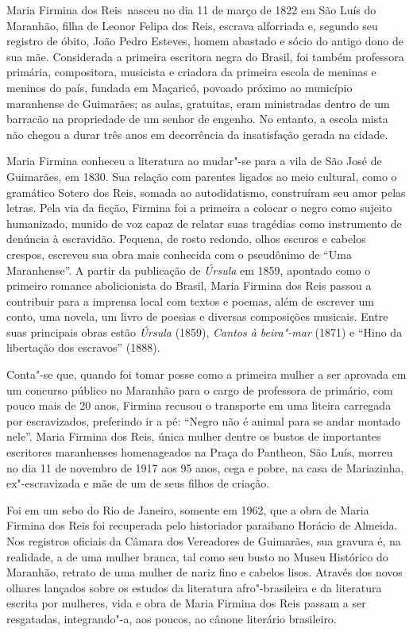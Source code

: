 
Maria Firmina dos Reis~nasceu no dia 11 de março de 1822 em São Luís do
Maranhão, filha de Leonor Felipa dos Reis, escrava alforriada e, segundo
seu registro de óbito, João Pedro Esteves, homem abastado e sócio do
antigo dono de sua mãe. Considerada a primeira escritora negra do
Brasil, foi também professora primária, compositora, musicista e
criadora da primeira escola de meninas e meninos do país, fundada em
Maçaricó, povoado próximo ao município maranhense de Guimarães; as
aulas, gratuitas, eram ministradas dentro de um barracão na propriedade
de um senhor de engenho. No entanto, a escola mista não chegou a durar
três anos em decorrência da insatisfação gerada na cidade.

Maria Firmina conheceu a literatura ao mudar"-se para a vila de São José
de Guimarães, em 1830. Sua relação com parentes ligados ao meio
cultural, como o gramático Sotero dos Reis, somada ao autodidatismo,
construíram seu amor pelas letras. Pela via da ficção, Firmina foi a
primeira a colocar o negro como sujeito humanizado, munido de voz capaz
de relatar suas tragédias como instrumento de denúncia à escravidão.
Pequena, de rosto redondo, olhos escuros e cabelos crespos, escreveu sua
obra mais conhecida com o pseudônimo de ``Uma Maranhense''. A partir da
publicação de \emph{Úrsula} em 1859, apontado como o primeiro romance
abolicionista do Brasil, Maria Firmina dos Reis passou a contribuir para
a imprensa local com textos e poemas, além de escrever um conto, uma
novela, um livro de poesias e diversas composições musicais. Entre suas
principais obras estão \emph{Úrsula} (1859), \emph{Cantos à beira"-mar}
(1871) e ``Hino da libertação dos escravos'' (1888).

Conta"-se que, quando foi tomar posse como a primeira mulher a ser
aprovada em um concurso público no Maranhão para o cargo de professora
de primário, com pouco mais de 20 anos, Firmina recusou o transporte em
uma liteira carregada por escravizados, preferindo ir a pé: ``Negro não
é animal para se andar montado nele''. Maria Firmina dos Reis, única
mulher dentre os bustos de importantes escritores maranhenses
homenageados na Praça do Pantheon, São Luís, morreu no dia 11 de
novembro de 1917 aos 95 anos, cega e pobre, na casa de Mariazinha,
ex"-escravizada e mãe de um de seus filhos de criação.

Foi em um sebo do Rio de Janeiro, somente em 1962, que a obra de Maria
Firmina dos Reis foi recuperada pelo historiador paraibano Horácio de
Almeida. Nos registros oficiais da Câmara dos Vereadores de Guimarães,
sua gravura é, na realidade, a de uma mulher branca, tal como seu busto
no Museu Histórico do Maranhão, retrato de uma mulher de nariz fino e
cabelos lisos. Através dos novos olhares lançados sobre os estudos da
literatura afro"-brasileira e da literatura escrita por mulheres, vida e
obra de Maria Firmina dos Reis passam a ser resgatadas, integrando"-a,
aos poucos, ao cânone literário brasileiro.

